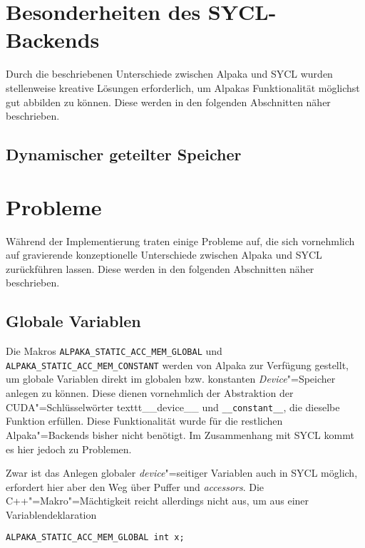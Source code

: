 \section{Besonderheiten des SYCL-Backends}
\label{implementierung:besonderheiten}

Durch die beschriebenen Unterschiede zwischen Alpaka und SYCL wurden
stellenweise kreative Lösungen erforderlich, um Alpakas Funktionalität möglichst
gut abbilden zu können. Diese werden in den folgenden Abschnitten näher
beschrieben.

\subsection{Dynamischer geteilter Speicher}
\label{implementierung:besonderheiten:sharedmem}

\section{Probleme}\label{implementierung:probleme}

Während der Implementierung traten einige Probleme auf, die sich vornehmlich
auf gravierende konzeptionelle Unterschiede zwischen Alpaka und SYCL
zurückführen lassen. Diese werden in den folgenden Abschnitten näher
beschrieben.

\subsection{Globale Variablen}\label{implementierung:probleme:globalvar}

Die Makros \texttt{ALPAKA\_STATIC\_ACC\_MEM\_GLOBAL} und
\texttt{ALPAKA\_STATIC\_ACC\_MEM\_CONSTANT} werden von Alpaka zur Verfügung
gestellt, um globale Variablen direkt im globalen bzw. konstanten
\textit{Device}"=Speicher anlegen zu können. Diese dienen vornehmlich der
Abstraktion der CUDA"=Schlüsselwörter texttt{\_\_device\_\_} und
\texttt{\_\_constant\_\_}, die dieselbe Funktion erfüllen. Diese Funktionalität
wurde für die restlichen Alpaka"=Backends bisher nicht benötigt. Im Zusammenhang
mit SYCL kommt es hier jedoch zu Problemen.

Zwar ist das Anlegen globaler \textit{device}"=seitiger Variablen auch in SYCL
möglich, erfordert hier aber den Weg über Puffer und \textit{accessors}. Die
C++"=Makro"=Mächtigkeit reicht allerdings nicht aus, um aus einer
Variablendeklaration

\begin{code}
    \begin{verbatim}
ALPAKA_STATIC_ACC_MEM_GLOBAL int x;
    \end{verbatim}
\end{code}

